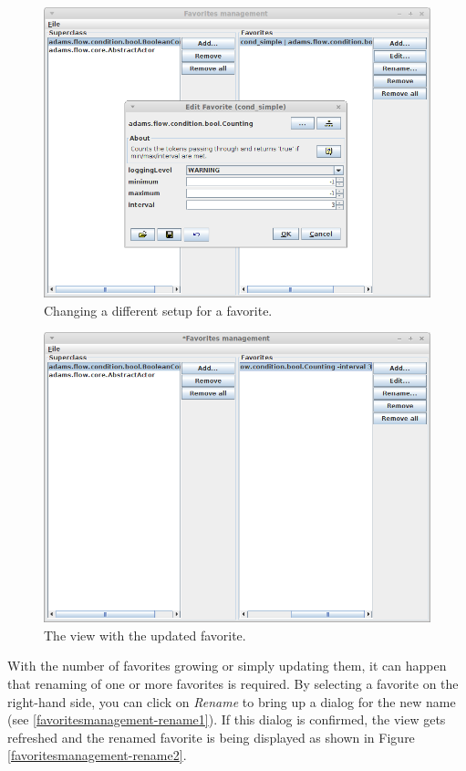 \begin{figure}[htb]
  \centering
  \includegraphics[width=12.0cm]{images/favoritesmanagement-edit1.png}
  \caption{Changing a different setup for a favorite.}
  \label{favoritesmanagement-edit1}
\end{figure}

\begin{figure}[htb]
  \centering
  \includegraphics[width=12.0cm]{images/favoritesmanagement-edit2.png}
  \caption{The view with the updated favorite.}
  \label{favoritesmanagement-edit2}
\end{figure}

\clearpage
{}
With the number of favorites growing or simply updating them, it can happen
that renaming of one or more favorites is required. By selecting a favorite
on the right-hand side, you can click on \textit{Rename} to bring up a dialog
for the new name (see \ref{favoritesmanagement-rename1}). If this dialog
is confirmed, the view gets refreshed and the renamed favorite is being
displayed as shown in Figure \ref{favoritesmanagement-rename2}.

